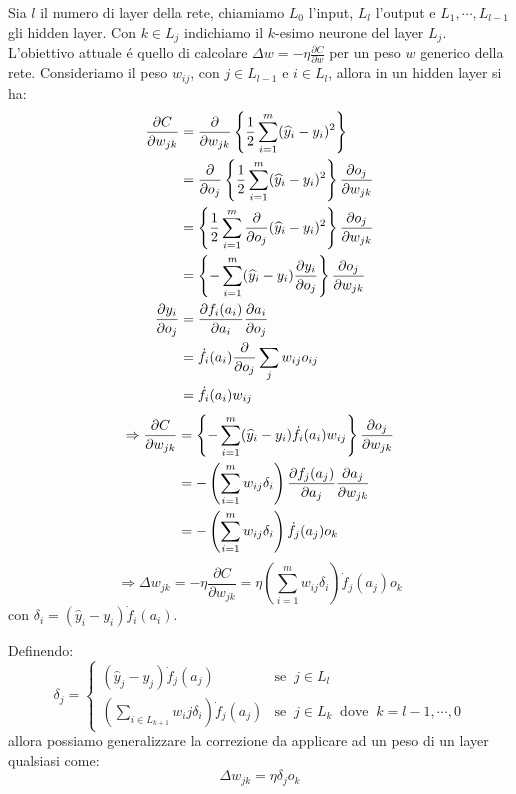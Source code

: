 \documentclass[a4paper,12pt]{report}
\begin{document}
 Sia $l$ il numero di layer della rete, chiamiamo $L_0$ l'input, $L_l$ l'output e $L_1, \cdots, L_{l-1}$ gli hidden layer. 
 Con $k \in L_j$ indichiamo il $k$-esimo neurone del layer $L_j$.
 L'obiettivo attuale \'e quello di calcolare $\Delta w = - \eta \frac{\partial C}{\partial w}$ per un peso $w$ generico della rete. 
 Consideriamo il peso $w_{ij}$, con $j \in L_{l-1}$ e $i \in L_l$, allora in un hidden layer si ha:
 \begin{align}
  \frac{\partial C}{\partial w_{jk}} &= \frac{\partial}{\partial w_{jk}} \left \{ \frac{1}{2} \sum_{i=1}^m (\widehat{y}_i -y_i)^2 \right \} \\
  &= \frac{\partial}{\partial o_j} \left \{ \frac{1}{2} \sum_{i=1}^m (\widehat{y}_i - y_i)^2 \right \} \frac{\partial o_j}{\partial w_{jk}} \notag \\
  &= \left \{ \frac{1}{2} \sum_{i=1}^m \frac{\partial}{\partial o_j} (\widehat{y}_i - y_i)^2 \right \} \frac{\partial o_j}{\partial w_{jk}} \notag \\
  &= \left \{ - \sum_{i=1}^m (\widehat{y}_i - y_i) \frac{\partial y_i}{\partial o_j} \right \} \frac{\partial o_j}{\partial w_{jk}} \notag \\
  \frac{\partial y_i}{\partial o_j} &= \frac{\partial f_i(a_i)}{\partial a_i} \frac{\partial a_i}{\partial o_j} \\
  &= \dot{f}_i(a_i) \frac{\partial}{\partial o_j} \sum_j w_{ij} o_{ij} \notag \\
  &= \dot{f}_i(a_i) w_{ij} \notag
 \end{align}
 \begin{align}
  \Rightarrow \frac{\partial C}{\partial w_{jk}} &= \left \{ - \sum_{i=1}^m (\widehat{y}_i - y_i) \dot{f}_i(a_i) w_{ij} \right \} \frac{\partial o_j}{\partial w_{jk}} \\
  &= - \left( \sum_{i=1}^m w_{ij} \delta_i \right) \frac{\partial f_j(a_j)}{\partial a_j} \frac{\partial a_j}{\partial w_{jk}} \notag \\
  &= - \left( \sum_{i=1}^m w_{ij} \delta_i \right) \dot{f}_j(a_j) o_k \notag
 \end{align}
 \begin{equation}
  \Rightarrow \Delta w_{jk} = - \eta \frac{\partial C}{\partial w_{jk}} = \eta \left(\sum_{i=1}^m w_{ij} \delta_i \right) \dot{f}_j(a_j) o_k
 \end{equation}
 con $\delta_i = (\widehat{y}_i - y_i) \dot{f}_i(a_i)$.
 
 Definendo:
 \begin{equation}
  \delta_j = \begin{cases}
                       (\widehat{y}_j - y_j) \dot{f}_j(a_j) & \mbox{se} \;\; j \in L_l \\
                       \left( \sum_{i \in L_{k+1}} w_ij \delta_i \right) \dot{f}_j(a_j) & \mbox{se} \;\; j \in L_k \;\; \mbox{dove} \;\; k = l-1,\cdots,0
                      \end{cases}
 \end{equation}
 allora possiamo generalizzare la correzione da applicare ad un peso di un layer qualsiasi come:
 \begin{equation}
  \Delta w_{jk} = \eta \delta_j o_k
 \end{equation}
\end{document}
